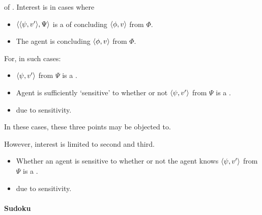\begin{note}
   of .
  Interest is in cases where

  \begin{itemize}
  \item
    \(\langle \langle \psi, v' \rangle, \Psi \rangle\) is a \requ{} of concluding \(\langle \phi, v \rangle\) from \(\Phi\).
  \item
    The agent is concluding \(\langle \phi, v \rangle\) from \(\Phi\).
  \end{itemize}
  For, in such cases:
  \begin{itemize}
  \item
    \(\langle \psi, v' \rangle\) from \(\Psi\) is a \fc{}.
  \item
    Agent is sufficiently `sensitive' to whether or not \(\langle \psi, v' \rangle\) from \(\Psi\) is a \fc{}.
  \item
    \ninf{} due to sensitivity.
  \end{itemize}
  In these cases, these three points may be objected to.

  However, interest is limited to second and third.

  \begin{itemize}
  \item
    Whether an agent is sensitive to whether or not the agent knows \(\langle \psi, v' \rangle\) from \(\Psi\) is a \fc{}.
  \item
     due to sensitivity.
  \end{itemize}
\end{note}

\paragraph{Sudoku}

